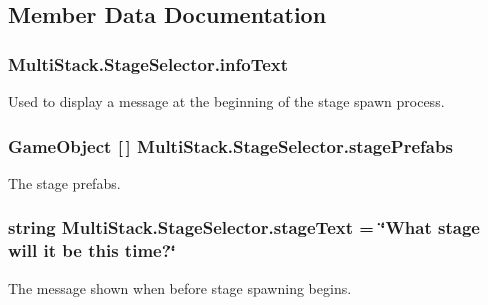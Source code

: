 \subsection{Member Data Documentation}
\hypertarget{class_multi_stack_1_1_stage_selector_a6f837e9ba7fc2d949f2d36ef97159835}{}
\subsubsection[{info\+Text}]{ Multi\+Stack.\+Stage\+Selector.\+info\+Text}\label{class_multi_stack_1_1_stage_selector_a6f837e9ba7fc2d949f2d36ef97159835}


Used to display a message at the beginning of the stage spawn process. 

\hypertarget{class_multi_stack_1_1_stage_selector_ac258ba40874a76a4293c7ed3b9a424d9}{}
\subsubsection[{stage\+Prefabs}]{\setlength{\rightskip}{0pt plus 5cm}Game\+Object \mbox{[}$\,$\mbox{]} Multi\+Stack.\+Stage\+Selector.\+stage\+Prefabs}\label{class_multi_stack_1_1_stage_selector_ac258ba40874a76a4293c7ed3b9a424d9}


The stage prefabs. 

\hypertarget{class_multi_stack_1_1_stage_selector_a199ae7412400d6e934dba1d2dc6b4f45}{}
\subsubsection[{stage\+Text}]{\setlength{\rightskip}{0pt plus 5cm}string Multi\+Stack.\+Stage\+Selector.\+stage\+Text = \char`\"{}What stage will it be this time?\char`\"{}}\label{class_multi_stack_1_1_stage_selector_a199ae7412400d6e934dba1d2dc6b4f45}


The message shown when before stage spawning begins. 



